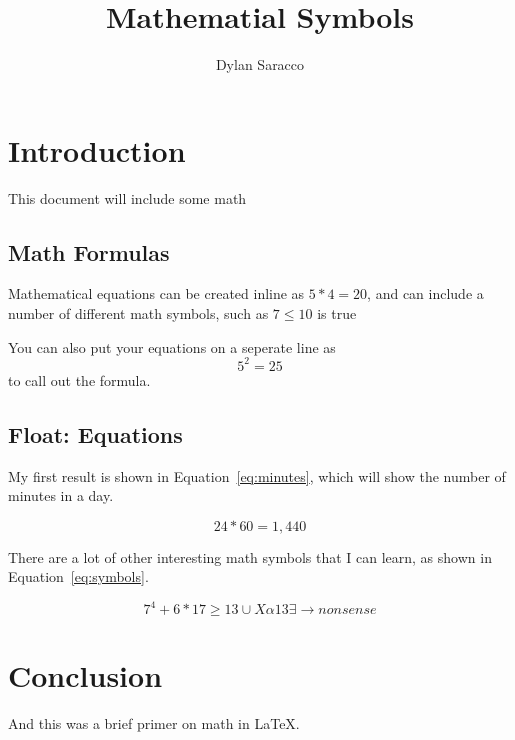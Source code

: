 \documentclass{article}
\title{Mathematial Symbols}
\author{Dylan Saracco}
\begin{document}
	\maketitle
	
	\section{Introduction}
	
	This document will include some math
	
		\subsection{Math Formulas}
		
		Mathematical equations can be created inline as $5*4=20$, and can include a number of different math symbols, such as $7 \leq 10$ is true
		
		You can also put your equations on a seperate line as \[5^2=25\] to call out the formula.
		\subsection{Float: Equations}
		
		My first result is shown in Equation~\ref{eq:minutes}, which will show the number of minutes in a day.
		
		\begin{equation}
		24*60 = 1,440
		\label{eq:minutes}
		\end{equation}
		
		There are a lot of other interesting math symbols that I can learn, as shown in Equation~\ref{eq:symbols}.
		
		\begin{equation}
		7^4+6*17 \geq 13 \cup X \alpha 13 \exists \rightarrow nonsense
		\label{eq:symbols}
		\end{equation}
	\section{Conclusion}
	
	And this was a brief primer on math in \LaTeX.
	
\end{document}
